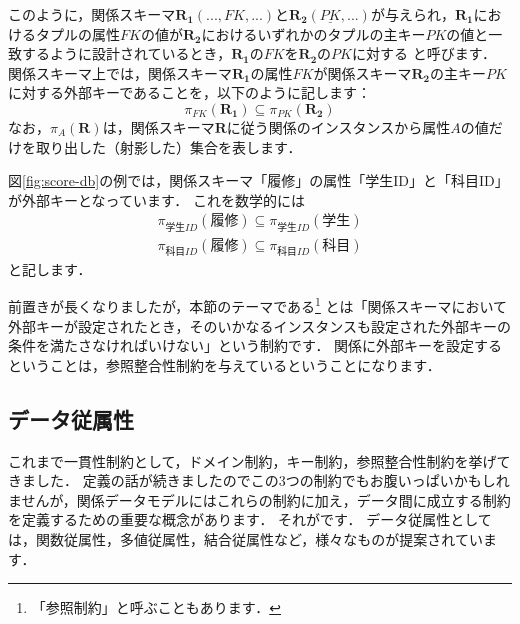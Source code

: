 このように，関係スキーマ$\boldsymbol{R_1}(..., FK, ...)$と$\boldsymbol{R_2}(\underline{PK}, ...)$が与えられ，$\boldsymbol{R_1}$におけるタプルの属性$FK$の値が$\boldsymbol{R_2}$におけるいずれかのタプルの主キー$PK$の値と一致するように設計されているとき，$\boldsymbol{R_1}$の$FK$を$\boldsymbol{R_2}$の$PK$に対する と呼びます．
関係スキーマ上では，関係スキーマ$\boldsymbol{R_1}$の属性$FK$が関係スキーマ$\boldsymbol{R_2}$の主キー$PK$に対する外部キーであることを，以下のように記します：
\begin{equation}
\pi_{FK}(\boldsymbol{R_1}) \subseteq \pi_{PK}(\boldsymbol{R_2})
\end{equation}
なお，$\pi_{A}(\boldsymbol{R})$は，関係スキーマ$\boldsymbol{R}$に従う関係のインスタンスから属性$A$の値だけを取り出した（射影した）集合を表します．

図\ref{fig:score-db}の例では，関係スキーマ「履修」の属性「学生ID」と「科目ID」が外部キーとなっています．
これを数学的には
\begin{align}
\pi_{学生ID}(\textbf{履修}) \subseteq \pi_{学生ID}(\textbf{学生}) \\
\pi_{科目ID}(\textbf{履修}) \subseteq \pi_{科目ID}(\textbf{科目})
\end{align}
と記します．

前置きが長くなりましたが，本節のテーマである\footnote{「参照制約」と呼ぶこともあります．} とは「関係スキーマにおいて外部キーが設定されたとき，そのいかなるインスタンスも設定された外部キーの条件を満たさなければいけない」という制約です．
関係に外部キーを設定するということは，参照整合性制約を与えているということになります．

\subsection{データ従属性}
これまで一貫性制約として，ドメイン制約，キー制約，参照整合性制約を挙げてきました．
定義の話が続きましたのでこの3つの制約でもお腹いっぱいかもしれませんが，関係データモデルにはこれらの制約に加え，データ間に成立する制約を定義するための重要な概念があります．
それがです．
データ従属性としては，関数従属性\cite{Armstrong1974}，多値従属性\cite{Fagin1977}，結合従属性など，様々なものが提案されています．

